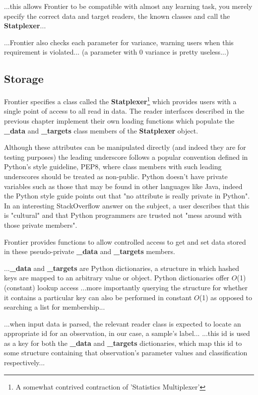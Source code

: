 ...this allows Frontier to be compatible with almost any learning task, you
merely specify the correct data and target readers, the known classes and call
the \textbf{Statplexer}...

...Frontier also checks each parameter for variance, warning users when this
requirement is violated... (a parameter with 0 variance is pretty useless...)

\subsection{Storage}

Frontier specifies a class called the \textbf{Statplexer}\footnote{A somewhat
contrived contraction of 'Statistics Multiplexer'} which provides users with a
single point of access to all read in data. The reader interfaces described in
the previous chapter implement their own loading functions which populate the
\textbf{\_data} and \textbf{\_targets} class members of the \textbf{Statplexer}
object.

Although these attributes can be manipulated directly (and indeed they are for
testing purposes) the leading underscore follows a popular convention defined in
Python's style guideline, PEP8\citep{pep8}, where class members with such
leading underscores should be treated as non-public. Python doesn't have private
variables such as those that may be found in other languages like Java, indeed
the Python style guide points out that "no attribute is really private in
Python"\citep{pep8}. In an interesting StackOverflow answer on the subject, a
user describes that this is "cultural"\citep{so:pythonprivate} and that Python
programmers are trusted not "mess around with those private members".

Frontier provides functions to allow controlled access to get and set data
stored in these pseudo-private \textbf{\_data} and \textbf{\_targets} members.

...\textbf{\_data} and \textbf{\_targets} are Python dictionaries, a structure
in which hashed keys are mapped to an arbitrary value or object. Python
dictionaries offer $O$(1) (constant) lookup\citep{py:timecomplexity} access
...more importantly querying the structure for whether it contains a particular
key can also be performed in constant $O$(1) as opposed to searching a list for
membership...

...when input data is parsed, the relevant reader class is expected to locate an
appropriate id for an observation, in our case, a sample's label...
...this id is used as a key for both the \textbf{\_data} and \textbf{\_targets}
dictionaries, which map this id to some structure containing that observation's
parameter values and classification respectively...

